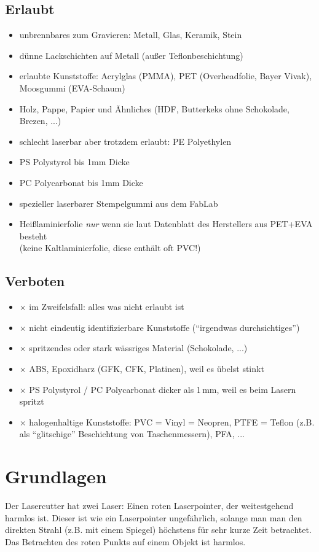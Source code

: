 \documentclass{\basedir/fablab-document}
\begin{document}
\subsection{Erlaubt}
\newcommand{\itemCheck}{\item[\checkmark]}
\begin{itemize}
\itemCheck unbrennbares zum Gravieren: Metall, Glas, Keramik, Stein
\itemCheck dünne Lackschichten auf Metall (außer Teflonbeschichtung)
\itemCheck erlaubte Kunststoffe: Acrylglas (PMMA), PET (Overheadfolie, Bayer Vivak), Moosgummi (EVA-Schaum)
\itemCheck Holz, Pappe, Papier und Ähnliches (HDF, Butterkeks ohne Schokolade, Brezen, ...)
\itemCheck schlecht laserbar aber trotzdem erlaubt: PE Polyethylen
\itemCheck PS Polystyrol bis 1mm Dicke
\itemCheck PC Polycarbonat bis 1mm Dicke
\itemCheck spezieller laserbarer Stempelgummi aus dem FabLab
\itemCheck Heißlaminierfolie \emph{nur} wenn sie laut Datenblatt des Herstellers aus PET+EVA besteht\\(keine Kaltlaminierfolie, diese enthält oft PVC!) 
\end{itemize}

\subsection{Verboten}
\newcommand{\itemCross}{\item[$\times$]}
\begin{itemize}
\itemCross im Zweifelsfall: alles was nicht erlaubt ist
\itemCross nicht eindeutig identifizierbare Kunststoffe (\enquote{irgendwas durchsichtiges})
\itemCross spritzendes oder stark wässriges Material (Schokolade, ...)
\itemCross ABS, Epoxidharz (GFK, CFK, Platinen), weil es übelst stinkt
\itemCross PS Polystyrol / PC Polycarbonat dicker als 1\,mm, weil es beim Lasern spritzt
\itemCross halogenhaltige Kunststoffe: PVC = Vinyl = Neopren, PTFE = Teflon (z.B. als \enquote{glitschige} Beschichtung von Taschenmessern), PFA, ...
\end{itemize}

\section{Grundlagen}
Der Lasercutter hat zwei Laser: Einen roten Laserpointer, der weitestgehend harmlos ist. Dieser ist wie ein Laserpointer ungefährlich, solange man man den direkten Strahl (z.B. mit einem Spiegel) höchstens für sehr kurze Zeit betrachtet. Das Betrachten des roten Punkts auf einem Objekt ist harmlos.
\end{document}
